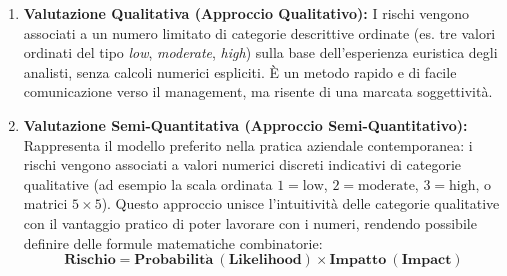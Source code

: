\documentclass[../../main.tex]{subfiles}
\begin{document}
\begin{enumerate}
    L'ALE consente di effettuare valutazioni economiche rigorose sul \textbf{Return on Security Investment (ROSI)}: l'adozione di un controllo di sicurezza risulta economicamente giustificata se e solo se il costo annuo di implementazione e mantenimento della contromisura ($C_{\text{control}}$) è inferiore alla riduzione netta dell'ALE conseguita:
    \begin{equation}
        \Delta \mathbf{ALE} = \mathbf{ALE}_{\text{pre}} - \mathbf{ALE}_{\text{post}} - C_{\text{control}} > 0
    \end{equation}
    
    Anche se i numeri ottenuti vengono rappresentati con molta precisione, va ricordato che tali valori devono essere valutati unicamente in termini di \textbf{ordini di grandezza} (un punteggio o un costo di 5.55 non indica un rischio davvero maggiore di un altro valutato 5.33, mentre è sicuramente più basso di un rischio valutato 112.34). I numeri ottenuti dall'approccio quantitativo sono spesso ingannevoli e creano una falsa illusione di esattezza matematica, data l'enorme varianza insita nella stima dell'ARO e degli impatti intangibili.
    
    \item \textbf{Valutazione Qualitativa (Approccio Qualitativo):} I rischi vengono associati a un numero limitato di categorie descrittive ordinate (es. tre valori ordinati del tipo \textit{low}, \textit{moderate}, \textit{high}) sulla base dell'esperienza euristica degli analisti, senza calcoli numerici espliciti. È un metodo rapido e di facile comunicazione verso il management, ma risente di una marcata soggettività.
    
    \item \textbf{Valutazione Semi-Quantitativa (Approccio Semi-Quantitativo):} Rappresenta il modello preferito nella pratica aziendale contemporanea: i rischi vengono associati a valori numerici discreti indicativi di categorie qualitative (ad esempio la scala ordinata $1 = \text{low}$, $2 = \text{moderate}$, $3 = \text{high}$, o matrici $5 \times 5$). Questo approccio unisce l'intuitività delle categorie qualitative con il vantaggio pratico di poter lavorare con i numeri, rendendo possibile definire delle formule matematiche combinatorie:
    \begin{equation}
        \mathbf{Rischio} = \mathbf{Probabilit\grave{a} \ (Likelihood)} \times \mathbf{Impatto \ (Impact)}
    \end{equation}
\end{enumerate}
\end{document}
